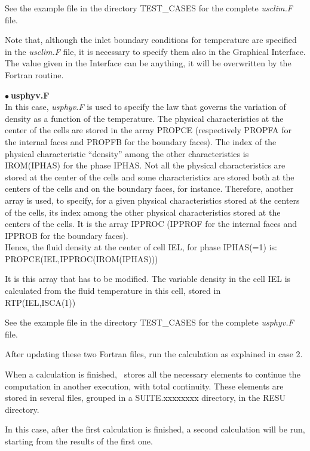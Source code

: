 See the example file in the directory TEST\_CASES for the complete 
{\itshape usclim.F} file.

Note that, although the inlet boundary conditions for temperature are specified
in the {\itshape usclim.F} file, it is necessary to specify them also in the
Graphical Interface. The value given in the Interface can be anything, it will
be overwritten by the Fortran routine.


$\bullet\ $\textbf{usphyv.F}\\
In this case, {\itshape usphyv.F} is used to specify the law that governs the
variation of density as a function of the temperature. The physical
characteristics at the center of the cells are stored in the array PROPCE
(respectively PROPFA for the internal faces and PROPFB for the boundary faces).
The index of the physical characteristic ``density'' among the other
characteristics is IROM(IPHAS) for the phase IPHAS.
Not all the physical characteristics are stored at the center of the cells and
some characteristics are stored both at the centers of the cells and on the
boundary faces, for instance.
Therefore, another array is used, to specify, for a given physical
characteristics stored at the centers of the cells, its index among the other
physical characteristics stored at the centers of the cells. It is the array
IPPROC (IPPROF for the internal faces and IPPROB for the boundary faces).\\
Hence, the fluid density at the center of cell IEL, for phase IPHAS(=1) is:\\
PROPCE(IEL,IPPROC(IROM(IPHAS)))

It is this array that has to be modified. The variable density in the cell IEL
is calculated from the fluid temperature in this cell, stored in\\
RTP(IEL,ISCA(1))

See the example file in the directory TEST\_CASES for the complete 
{\itshape usphyv.F} file.


After updating these two Fortran files, run the calculation as explained in case
2.


\newpage
When a calculation is finished, \CS\ stores all the necessary elements to
continue the computation in another execution, with total continuity. These
elements are stored in several files, grouped in a SUITE.xxxxxxxx directory, in
the RESU directory.

In this case, after the first calculation is finished, a second calculation will
be run, starting from the results of the first one.


